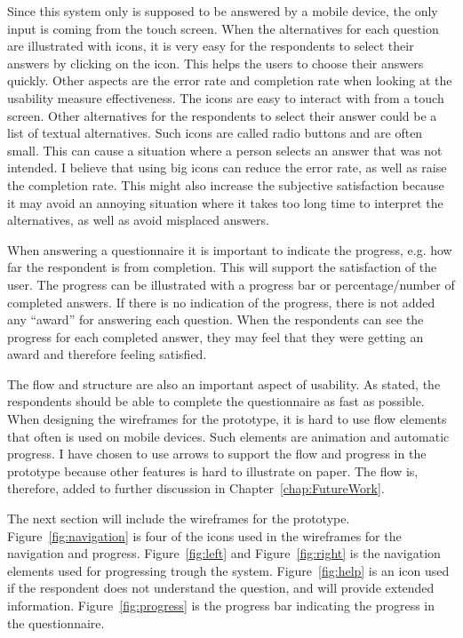   Since this system only is supposed to be answered by a mobile device, the only input is coming from the touch screen. When the alternatives for each question are illustrated with icons, it is very easy for the respondents to select their answers by clicking on the icon. This helps the users to choose their answers quickly. Other aspects are the error rate and completion rate when looking at the usability measure effectiveness. The icons are easy to interact with from a touch screen. Other alternatives for the respondents to select their answer could be a list of textual alternatives. Such icons are called radio buttons and are often small. This can cause a situation where a person selects an answer that was not intended. I believe that using big icons can reduce the error rate, as well as raise the completion rate. This might also increase the subjective satisfaction because it may avoid an annoying situation where it takes too long time to interpret the alternatives, as well as avoid misplaced answers.

  When answering a questionnaire it is important to indicate the progress, e.g. how far the respondent is from completion. This will support the satisfaction of the user. The progress can be illustrated with a progress bar or percentage/number of completed answers. If there is no indication of the progress, there is not added any ``award'' for answering each question. When the respondents can see the progress for each completed answer, they may feel that they were getting an award and therefore feeling satisfied.

  The flow and structure are also an important aspect of usability. As stated, the respondents should be able to complete the questionnaire as fast as possible. When designing the wireframes for the prototype, it is hard to use flow elements that often is used on mobile devices. Such elements are animation and automatic progress. I have chosen to use arrows to support the flow and progress in the prototype because other features is hard to illustrate on paper. The flow is, therefore, added to further discussion in Chapter~\ref{chap:FutureWork}.

  The next section will include the wireframes for the prototype. Figure~\ref{fig:navigation} is four of the icons used in the wireframes for the navigation and progress. Figure~\ref{fig:left} and Figure~\ref{fig:right} is the navigation elements used for progressing trough the system. Figure~\ref{fig:help} is an icon used if the respondent does not understand the question, and will provide extended information. Figure~\ref{fig:progress} is the progress bar indicating the progress in the questionnaire. 

